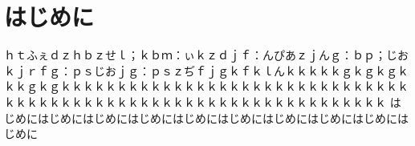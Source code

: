 
\section{はじめに}
ｈｔふぇｄｚｈｂｚせｌ；ｋｂｍ：ぃｋｚｄｊｆ：んぴあｚｊんｇ：ｂｐ；じおｋｊｒｆｇ：ｐｓじおｊｇ：ｐｓｚぢｆｊｇｋｆｋｌんｋｋｋｋｋｇｋｇｋｇｋｋｋｇｋｇｋｋｋｋｋｋｋｋｋｋｋｋｋｋｋｋｋｋｋｋｋｋｋｋｋｋｋｋｋｋｋｋｋｋｋｋｋｋｋｋｋｋｋｋｋｋｋｋｋｋｋｋｋｋｋｋｋｋｋｋｋｋｋｋｋ
はじめにはじめにはじめにはじめにはじめにはじめにはじめにはじめにはじめにはじめに
